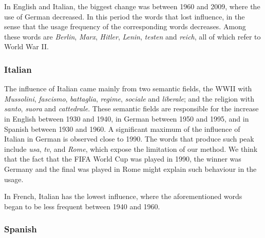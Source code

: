 \documentclass[10pt,letterpaper]{article} %
\begin{document}
In English and Italian, the biggest change was between 1960 and 2009, where the
use of German decreased. In this period the words that lost influence, in the
sense that the usage frequency of the corresponding words decreases. 
Among these words are 
\textit{Berlin}, \textit{Marx},
\textit{Hitler}, \textit{Lenin}, \textit{testen}  and \textit{reich}, all of which
refer to World War II.
\subsubsection*{Italian} %


The influence of Italian came mainly from two semantic fields, the WWII with
\textit{Mussolini}, \textit{fascismo}, \textit{battaglia}, \textit{regime},
\textit{sociale} and \textit{liberale}; and the religion with \textit{santo},
\textit{suora} and \textit{cattedrale}. These semantic fields are
responsible for the increase in English between 1930 and 1940, in German
between 1950 and 1995, and in Spanish between 1930 and 1960.
A significant maximum of the influence of Italian in German is observed close to 1990. 
The words that produce such peak include 
\textit{usa},  \textit{tv}, and \textit{Rome}, which expose the limitation of our method. 
We think that the fact that the FIFA World Cup was played in 1990, the winner was Germany 
and the final was played in Rome might explain such behaviour in the usage. 
% 

In French, Italian has the lowest influence, where the aforementioned words
began to be less frequent between 1940 and 1960.
\subsubsection*{Spanish} %
\end{document}
